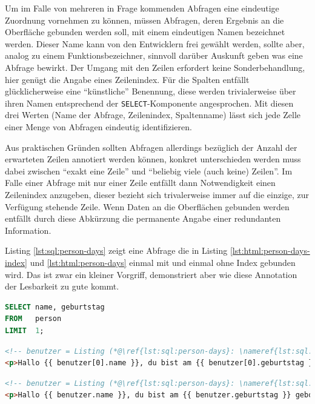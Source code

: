 Um im Falle von mehreren in Frage kommenden Abfragen eine eindeutige Zuordnung vornehmen zu können, müssen Abfragen, deren Ergebnis an die Oberfläche gebunden werden soll, mit einem eindeutigen Namen bezeichnet werden. Dieser Name kann von den Entwicklern frei gewählt werden, sollte aber, analog zu einem Funktionsbezeichner, sinnvoll darüber Auskunft geben was eine Abfrage bewirkt. Der Umgang mit den Zeilen erfordert keine Sonderbehandlung, hier genügt die Angabe eines Zeilenindex. Für die Spalten entfällt glücklicherweise eine ``künstliche'' Benennung, diese werden trivialerweise über ihren Namen entsprechend der \texttt{SELECT}-Komponente angesprochen. Mit diesen drei Werten (Name der Abfrage, Zeilenindex, Spaltenname) lässt sich jede Zelle einer Menge von Abfragen eindeutig identifizieren.

Aus praktischen Gründen sollten Abfragen allerdings bezüglich der Anzahl der erwarteten Zeilen annotiert werden können, konkret unterschieden werden muss dabei zwischen ``exakt eine Zeile'' und ``beliebig viele (auch keine) Zeilen''. Im Falle einer Abfrage mit nur einer Zeile entfällt dann Notwendigkeit einen Zeilenindex anzugeben, dieser bezieht sich trivalerweise immer auf die einzige, zur Verfügung stehende Zeile. Wenn Daten an die Oberflächen gebunden werden entfällt durch diese Abkürzung die permanente Angabe einer redundanten Information.

Listing \ref{lst:sql:person-days} zeigt eine Abfrage die in Listing \ref{lst:html:person-days-index} und \ref{lst:html:person-days} einmal mit und einmal ohne Index gebunden wird. Das ist zwar ein kleiner Vorgriff, demonstriert aber wie diese Annotation der Lesbarkeit zu gute kommt.

\begin{lstlisting}[language=SQL, caption=Abfrage mit garantiert einer Ergebniszeile,label=lst:sql:person-days]
SELECT name, geburtstag
FROM   person
LIMIT  1;
\end{lstlisting}

\begin{lstlisting}[language=HTML, caption=String-Interpolation mit Indexzugriff, label=lst:html:person-days-index]
<!-- benutzer = Listing (*@\ref{lst:sql:person-days}: \nameref{lst:sql:person-days}@*) -->
<p>Hallo {{ benutzer[0].name }}, du bist am {{ benutzer[0].geburtstag }} geboren.</p>
\end{lstlisting}

\begin{lstlisting}[language=HTML, caption=String-Interpolation mit implizitem Index, label=lst:html:person-days]
<!-- benutzer = Listing (*@\ref{lst:sql:person-days}: \nameref{lst:sql:person-days}@*) -->
<p>Hallo {{ benutzer.name }}, du bist am {{ benutzer.geburtstag }} geboren.</p>
\end{lstlisting}

